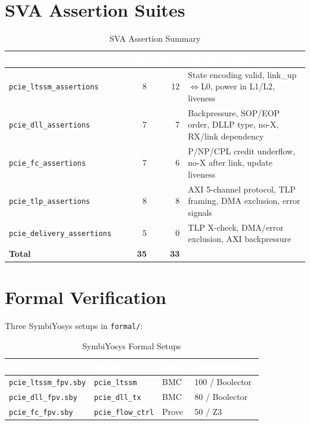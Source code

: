 \documentclass[12pt,a4paper]{report}
\newcommand{\theadcell}[1]{%
  \cellcolor{tablehead}\textcolor{white}{\textbf{#1}}}
\begin{document}
\section{SVA Assertion Suites}

\begin{table}[H]
\centering
\caption{SVA Assertion Summary}
\label{tab:sva}
\begin{tabular}{lrrl}
  \toprule
  \theadcell{Module} & \theadcell{Assert} & \theadcell{Cover} & \theadcell{Key Properties} \\
  \midrule
  \texttt{pcie\_ltssm\_assertions} & 8 & 12 & State encoding valid, link\_up$\Leftrightarrow$L0, power in L1/L2, liveness \\
  \texttt{pcie\_dll\_assertions}   & 7 & 7  & Backpressure, SOP/EOP order, DLLP type, no-X, RX/link dependency \\
  \texttt{pcie\_fc\_assertions}    & 7 & 6  & P/NP/CPL credit underflow, no-X after link, update liveness \\
  \texttt{pcie\_tlp\_assertions}   & 8 & 8  & AXI 5-channel protocol, TLP framing, DMA exclusion, error signals \\
  \texttt{pcie\_delivery\_assertions} & 5 & 0 & TLP X-check, DMA/error exclusion, AXI backpressure \\
  \midrule
  \textbf{Total} & \textbf{35} & \textbf{33} & \\
  \bottomrule
\end{tabular}
\end{table}

\section{Formal Verification}

Three SymbiYosys setups in \texttt{formal/}:

\begin{table}[H]
\centering
\caption{SymbiYosys Formal Setups}
\label{tab:formal}
\begin{tabular}{llll}
  \toprule
  \theadcell{File} & \theadcell{Target} & \theadcell{Mode} & \theadcell{Depth/Engine} \\
  \midrule
  \texttt{pcie\_ltssm\_fpv.sby} & \texttt{pcie\_ltssm}     & BMC   & 100 / Boolector \\
  \texttt{pcie\_dll\_fpv.sby}   & \texttt{pcie\_dll\_tx}   & BMC   & 80  / Boolector \\
  \texttt{pcie\_fc\_fpv.sby}    & \texttt{pcie\_flow\_ctrl}& Prove & 50  / Z3 \\
  \bottomrule
\end{tabular}
\end{table}
\end{document}
